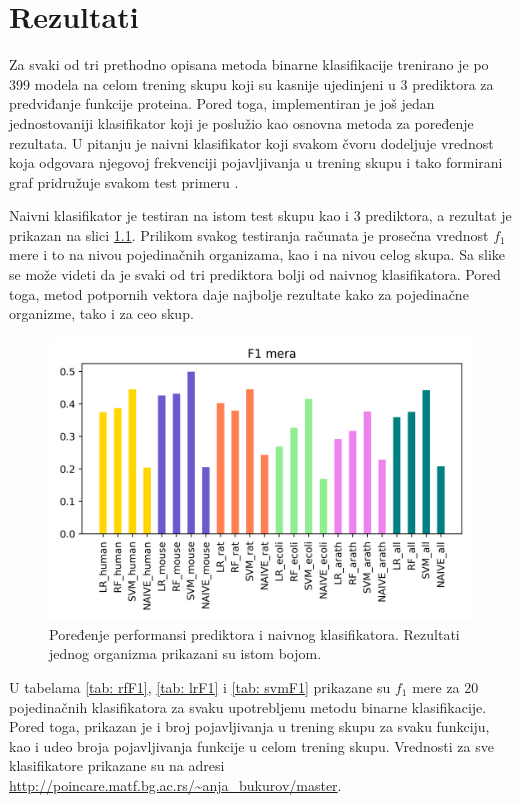 \chapter{Rezultati} %
\label{Chapter6}

Za svaki od tri prethodno opisana metoda binarne klasifikacije trenirano je po 399 modela na celom trening skupu koji su kasnije ujedinjeni u 3 prediktora za predviđanje funkcije proteina. Pored toga, implementiran je još jedan jednostovaniji klasifikator koji je poslužio kao osnovna metoda za poređenje rezultata. U pitanju je naivni klasifikator koji svakom čvoru dodeljuje vrednost koja odgovara njegovoj frekvenciji pojavljivanja u trening skupu i tako formirani graf pridružuje svakom test primeru \cite{doktJK}. 

Naivni klasifikator je testiran na istom test skupu kao i 3 prediktora, a rezultat je prikazan na slici \ref{fig:f1scores}. Prilikom svakog testiranja računata je prosečna vrednost $f_1$ mere i to na nivou pojedinačnih organizama, kao i na nivou celog skupa. Sa slike se može videti da je svaki od tri prediktora bolji od naivnog klasifikatora. Pored toga, metod potpornih vektora daje najbolje rezultate kako za pojedinačne organizme, tako i za ceo skup.


\begin{figure}[h]
	\centering
	\includegraphics[width=\textwidth]{Figures/f1_scores.png}
	\caption{Poređenje performansi prediktora i naivnog klasifikatora. Rezultati jednog organizma prikazani su istom bojom.}
	\label{fig:f1scores}
\end{figure}


U tabelama \ref{tab: rfF1}, \ref{tab: lrF1} i \ref{tab: svmF1} prikazane su $f_1$ mere za 20 pojedinačnih klasifikatora za svaku upotrebljenu metodu binarne klasifikacije. Pored toga, prikazan je i broj pojavljivanja u trening skupu za svaku funkciju, kao i udeo broja pojavljivanja funkcije u celom trening skupu. Vrednosti za sve klasifikatore prikazane su na adresi \url{http://poincare.matf.bg.ac.rs/~anja_bukurov/master}.

